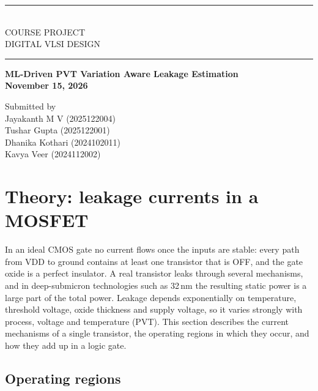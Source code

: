 \documentclass[10pt]{article}
\begin{document}
\begin{titlepage}
\centering
\vspace*{3cm}
\rule{\textwidth}{0.6pt}\\[14pt]
{\LARGE COURSE PROJECT}\\[6pt]
{\LARGE DIGITAL VLSI DESIGN}\\[10pt]
\rule{\textwidth}{0.6pt}

\vspace{1.5cm}
{\Large\bfseries ML-Driven PVT Variation Aware Leakage Estimation}\\[14pt]
{\bfseries November 15, 2026}

\vspace{3cm}
{\large Submitted by}\\[10pt]
Jayakanth M V (2025122004)\\[2pt]
Tushar Gupta (2025122001)\\[2pt]
Dhanika Kothari (2024102011)\\[2pt]
Kavya Veer (2024112002)

\vfill
\end{titlepage}

\section{Theory: leakage currents in a MOSFET}

In an ideal CMOS gate no current flows once the inputs are stable: every path from VDD to ground
contains at least one transistor that is OFF, and the gate oxide is a perfect insulator. A real
transistor leaks through several mechanisms, and in deep-submicron technologies such as 32\,nm the
resulting static power is a large part of the total power. Leakage depends exponentially on
temperature, threshold voltage, oxide thickness and supply voltage, so it varies strongly with
process, voltage and temperature (PVT). This section describes the current mechanisms of a single
transistor, the operating regions in which they occur, and how they add up in a logic gate.

\subsection*{Operating regions}
\end{document}
